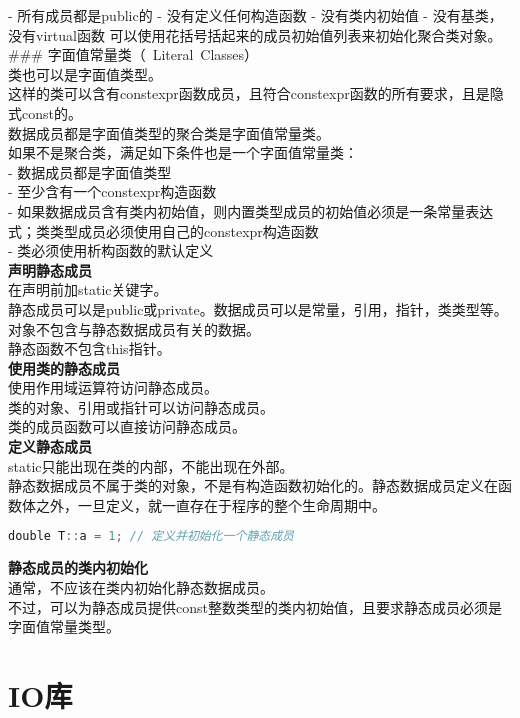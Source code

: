\documentclass[
  a4paper,
  oneside,tablecaptionabove
]{scrbook}
\begin{document}
- 所有成员都是public的 - 没有定义任何构造函数 - 没有类内初始值 -
没有基类，没有virtual函数
可以使用花括号括起来的成员初始值列表来初始化聚合类对象。\\
\#\#\# 字面值常量类（~Literal~Classes）\\
类也可以是字面值类型。\\
这样的类可以含有constexpr函数成员，且符合constexpr函数的所有要求，且是隐式const的。\\
数据成员都是字面值类型的聚合类是字面值常量类。\\
如果不是聚合类，满足如下条件也是一个字面值常量类：\\
- 数据成员都是字面值类型\\
- 至少含有一个constexpr构造函数\\
-
如果数据成员含有类内初始值，则内置类型成员的初始值必须是一条常量表达式；类类型成员必须使用自己的constexpr构造函数\\
- 类必须使用析构函数的默认定义\\
\textbf{声明静态成员}\\
在声明前加static关键字。\\
静态成员可以是public或private。数据成员可以是常量，引用，指针，类类型等。\\
对象不包含与静态数据成员有关的数据。\\
静态函数不包含this指针。\\
\textbf{使用类的静态成员}\\
使用作用域运算符访问静态成员。\\
类的对象、引用或指针可以访问静态成员。\\
类的成员函数可以直接访问静态成员。\\
\textbf{定义静态成员}\\
static只能出现在类的内部，不能出现在外部。\\
静态数据成员不属于类的对象，不是有构造函数初始化的。静态数据成员定义在函数体之外，一旦定义，就一直存在于程序的整个生命周期中。

\begin{lstlisting}[language={C++}]
double T::a = 1; // 定义并初始化一个静态成员
\end{lstlisting}

\textbf{静态成员的类内初始化}\\
通常，不应该在类内初始化静态数据成员。\\
不过，可以为静态成员提供const整数类型的类内初始值，且要求静态成员必须是字面值常量类型。

\chapter{IO库}\label{ioux5e93}
\end{document}
